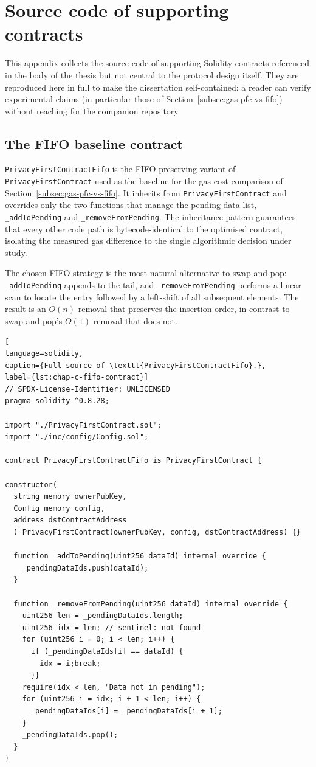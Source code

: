 \chapter{Source code of supporting contracts}\label{ch:appendix-c-fifo-sc}

This appendix collects the source code of supporting Solidity contracts
referenced in the body of the thesis but not central to the protocol
design itself.
They are reproduced here in full to make the dissertation
self-contained: a reader can verify experimental claims (in particular
those of Section~\ref{subsec:gas-pfc-vs-fifo}) without reaching for the
companion repository.

\section{The FIFO baseline contract}\label{sec:app-c-fifo-contract}

\texttt{PrivacyFirstContractFifo} is the FIFO-preserving variant of
\texttt{PrivacyFirstContract} used as the baseline for the gas-cost
comparison of Section~\ref{subsec:gas-pfc-vs-fifo}.
It inherits from
\texttt{PrivacyFirstContract} and overrides only the two functions that
manage the pending data list, \texttt{\_addToPending} and
\texttt{\_removeFromPending}.
The inheritance pattern guarantees that
every other code path is bytecode-identical to the optimised contract,
isolating the measured gas difference to the single algorithmic
decision under study.

The chosen FIFO strategy is the most natural alternative to swap-and-pop:
\texttt{\_addToPending} appends to the tail, and \texttt{\_removeFromPending}
performs a linear scan to locate the entry followed by a left-shift of all
subsequent elements. The result is an \(O(n)\) removal that
preserves the insertion order, in contrast to swap-and-pop's
\(O(1)\) removal that does not.

\begin{lstlisting}[
language=solidity,
caption={Full source of \texttt{PrivacyFirstContractFifo}.},
label={lst:chap-c-fifo-contract}]
// SPDX-License-Identifier: UNLICENSED
pragma solidity ^0.8.28;

import "./PrivacyFirstContract.sol";
import "./inc/config/Config.sol";

contract PrivacyFirstContractFifo is PrivacyFirstContract {

constructor(
  string memory ownerPubKey,
  Config memory config,
  address dstContractAddress
  ) PrivacyFirstContract(ownerPubKey, config, dstContractAddress) {}

  function _addToPending(uint256 dataId) internal override {
    _pendingDataIds.push(dataId);
  }

  function _removeFromPending(uint256 dataId) internal override {
    uint256 len = _pendingDataIds.length;
    uint256 idx = len; // sentinel: not found
    for (uint256 i = 0; i < len; i++) {
      if (_pendingDataIds[i] == dataId) {
        idx = i;break;
      }}
    require(idx < len, "Data not in pending");
    for (uint256 i = idx; i + 1 < len; i++) {
      _pendingDataIds[i] = _pendingDataIds[i + 1];
    }
    _pendingDataIds.pop();
  }
}
\end{lstlisting}